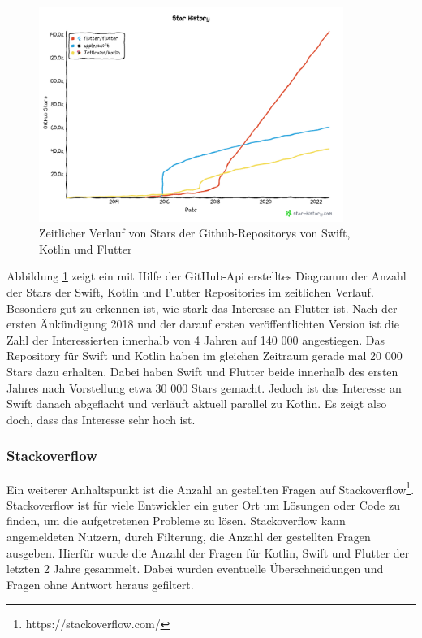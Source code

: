 \begin{figure}[ht]
  \centering
  \includegraphics[height=7cm,keepaspectratio]{images/star-history_programming languages.png} 
  \caption[Zeitlicher Verlauf von Stars der Github-Repositorys von Swift, Kotlin und Flutter]{Zeitlicher Verlauf von Stars der Github-Repositorys von Swift, Kotlin und Flutter\protect\footnotemark }
  \label{fig:star_history}
\end{figure}


Abbildung \ref{fig:star_history} zeigt ein mit Hilfe der GitHub-Api erstelltes Diagramm der Anzahl der Stars der Swift, Kotlin und Flutter Repositories im zeitlichen Verlauf. 
Besonders gut zu erkennen ist, wie stark das Interesse an Flutter ist. Nach der ersten Änkündigung 2018 und der darauf ersten veröffentlichten Version ist die Zahl der Interessierten innerhalb von 4 Jahren auf 140 000 angestiegen. Das Repository für Swift und Kotlin haben im gleichen Zeitraum gerade mal 20 000 Stars dazu erhalten. Dabei haben Swift und Flutter beide innerhalb des ersten Jahres nach Vorstellung etwa 30 000 Stars gemacht. Jedoch ist das Interesse an Swift danach abgeflacht und verläuft aktuell parallel zu Kotlin. Es zeigt also doch, dass das Interesse sehr hoch ist.

\subsubsection{Stackoverflow}
Ein weiterer Anhaltspunkt ist die Anzahl an gestellten Fragen auf Stackoverflow\footnote{https://stackoverflow.com/}. Stackoverflow ist für viele Entwickler ein guter Ort um Lösungen oder Code zu finden, um die aufgetretenen Probleme zu lösen. Stackoverflow kann angemeldeten Nutzern, durch Filterung, die Anzahl der gestellten Fragen ausgeben. Hierfür wurde die Anzahl der Fragen für Kotlin, Swift und Flutter der letzten 2 Jahre gesammelt. Dabei wurden eventuelle Überschneidungen und Fragen ohne Antwort heraus gefiltert.

